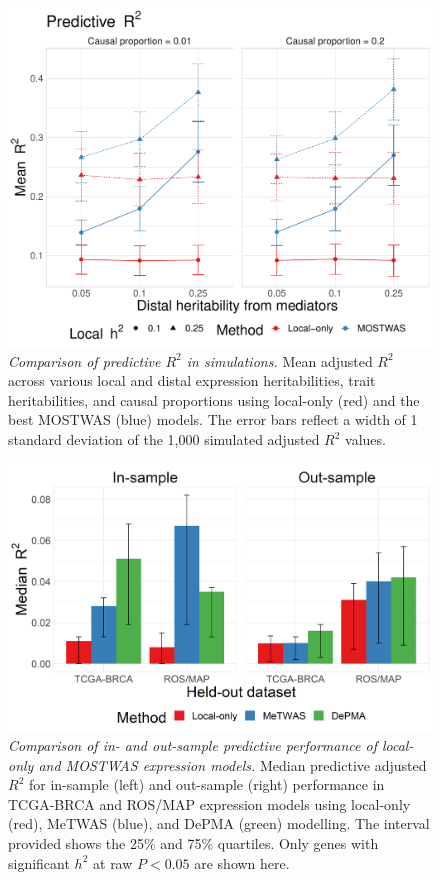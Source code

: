 \documentclass[11pt]{article}
\begin{document}
\begin{center}
\begin{figure}[!h]
    \includegraphics[width=\textwidth]{figures/ch4_suppfig1.pdf}
    \caption{\emph{Comparison of predictive $R^2$ in simulations.}
    Mean adjusted $R^2$ across various local and distal expression
    heritabilities, trait heritabilities,
    and causal proportions using local-only (red)
    and the best MOSTWAS (blue) models. The error bars
    reflect a width of 1 standard deviation
    of the 1,000 simulated adjusted $R^2$ values.}
    \label{fig:ch4_suppfig1}
\end{figure}
\end{center}

\begin{center}
\begin{figure}[!h]
    \includegraphics[width=\textwidth]{figures/ch4_suppfig3_5.png}
    \caption{\emph{Comparison of in-
    and out-sample predictive performance
    of local-only and MOSTWAS expression models.}
   Median predictive adjusted $R^2$
   for in-sample (left) and out-sample (right)
   performance in TCGA-BRCA and ROS/MAP
   expression models using local-only (red),
   MeTWAS (blue), and DePMA (green) modelling.
   The interval provided shows the 25\% and 75\%
   quartiles. Only genes with significant $h^2$
   at raw $P < 0.05$ are shown here.}
    \label{fig:ch4_suppfig3_5}
\end{figure}
\end{center}
\end{document}
